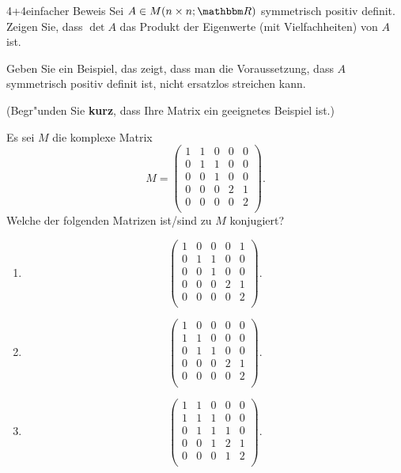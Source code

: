 \documentclass[a4paper]{article}
\begin{document}
\pagebreak
\begin{klaufg}{4+4}{einfacher Beweis}
Sei $A \in M(n \times n; \R)$ symmetrisch positiv
definit. Zeigen Sie, dass $\det A$ das Produkt der Eigenwerte
(mit Vielfachheiten) von $A$ ist.
\vfill

%
Geben Sie ein Beispiel, das zeigt, dass man die Voraussetzung, dass
$A$ symmetrisch positiv definit ist, nicht ersatzlos streichen kann.

(Begr"unden Sie {\bfseries\sffamily kurz}, dass Ihre Matrix ein
geeignetes Beispiel ist.)
\vfill

\end{klaufg}

\begin{klaufg}{8}{}

Es sei $M$ die komplexe Matrix
\[
M = \begin{pmatrix}
1 & 1 & 0 & 0 & 0 \\
0 & 1 & 1 & 0 & 0 \\
0 & 0 & 1 & 0 & 0 \\
0 & 0 & 0 & 2 & 1 \\
0 & 0 & 0 & 0 & 2 \\
\end{pmatrix}.
\]
Welche der folgenden Matrizen ist/sind zu $M$ konjugiert?
\begin{enumerate}
\item
\[
\begin{pmatrix}
1 & 0 & 0 & 0 & 1 \\
0 & 1 & 1 & 0 & 0 \\
0 & 0 & 1 & 0 & 0 \\
0 & 0 & 0 & 2 & 1 \\
0 & 0 & 0 & 0 & 2 \\
\end{pmatrix}.
\]
\item
\[
\begin{pmatrix}
1 & 0 & 0 & 0 & 0 \\
1 & 1 & 0 & 0 & 0 \\
0 & 1 & 1 & 0 & 0 \\
0 & 0 & 0 & 2 & 1 \\
0 & 0 & 0 & 0 & 2 \\
\end{pmatrix}.
\]
\item
\[
\begin{pmatrix}
1 & 1 & 0 & 0 & 0 \\
1 & 1 & 1 & 0 & 0 \\
0 & 1 & 1 & 1 & 0 \\
0 & 0 & 1 & 2 & 1 \\
0 & 0 & 0 & 1 & 2 \\
\end{pmatrix}.
\]
\end{enumerate}

\end{klaufg}
\end{document}
